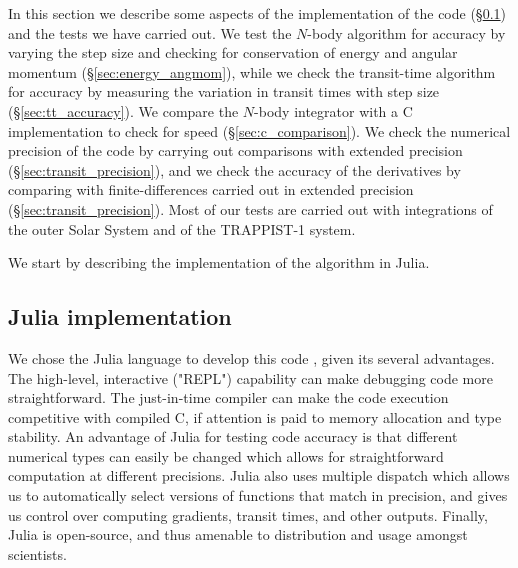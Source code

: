 \documentclass[fleqn,usenatbib,twocolumn]{mnras}
\begin{document}
In this section we describe some aspects of the implementation  of the code (\S \ref{sec:julia}) and the tests we have carried out.   We test the $N$-body algorithm for accuracy by varying the step size and checking for conservation of energy and angular momentum (\S \ref{sec:energy_angmom}), while we check the transit-time algorithm for accuracy by  measuring the variation in transit times with step size (\S \ref{sec:tt_accuracy}).
We compare the $N$-body integrator with a C implementation to check for speed (\S \ref{sec:c_comparison}).
We check the numerical precision of the code by carrying out comparisons with extended precision (\S \ref{sec:transit_precision}), and we check the accuracy of the derivatives by comparing with finite-differences carried out in extended precision (\S \ref{sec:transit_precision}).
Most of our tests are carried out with integrations of the outer Solar System and of the TRAPPIST-1 system.

We start by describing the implementation of the algorithm in Julia.

\subsection{Julia implementation} \label{sec:julia}

We chose the Julia language to develop this code \citep{Bezanson2017},
given its several advantages. The high-level,
interactive ("REPL") capability can make debugging code more straightforward.
The just-in-time compiler can make the code execution competitive with compiled
C, if attention is paid to memory allocation and type stability.  An advantage of Julia for testing code accuracy is that different numerical types can easily be changed which allows for straightforward computation at different precisions.  Julia also uses multiple dispatch which allows us to automatically select versions of functions that match in precision, and gives us control over computing gradients, transit times, and other outputs. Finally, Julia is open-source, and thus amenable to distribution and usage amongst scientists.
\end{document}

